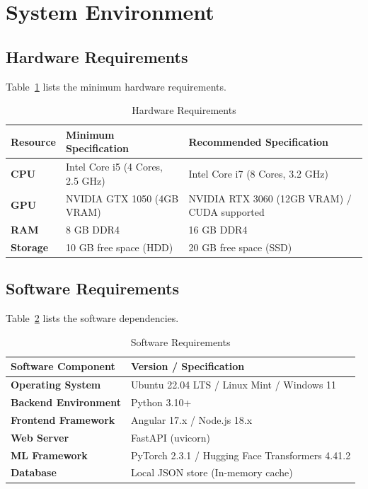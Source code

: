 \documentclass[12pt,a4paper,oneside]{report}
\begin{document}
\section{System Environment}

\subsection{Hardware Requirements}
Table~\ref{tab:hardware_reqs} lists the minimum hardware requirements.

\begin{table}[H]
    \centering
    \caption{Hardware Requirements}
    \label{tab:hardware_reqs}
    \begin{tabular}{lll}
        \toprule
        \textbf{Resource} & \textbf{Minimum Specification} & \textbf{Recommended Specification} \\
        \midrule
        \textbf{CPU} & Intel Core i5 (4 Cores, 2.5 GHz) & Intel Core i7 (8 Cores, 3.2 GHz) \\
        \textbf{GPU} & NVIDIA GTX 1050 (4GB VRAM) & NVIDIA RTX 3060 (12GB VRAM) / CUDA supported \\
        \textbf{RAM} & 8 GB DDR4 & 16 GB DDR4 \\
        \textbf{Storage} & 10 GB free space (HDD) & 20 GB free space (SSD) \\
        \bottomrule
    \end{tabular}
\end{table}

\subsection{Software Requirements}
Table~\ref{tab:software_reqs} lists the software dependencies.

\begin{table}[H]
    \centering
    \caption{Software Requirements}
    \label{tab:software_reqs}
    \begin{tabular}{ll}
        \toprule
        \textbf{Software Component} & \textbf{Version / Specification} \\
        \midrule
        \textbf{Operating System} & Ubuntu 22.04 LTS / Linux Mint / Windows 11 \\
        \textbf{Backend Environment} & Python 3.10+ \\
        \textbf{Frontend Framework} & Angular 17.x / Node.js 18.x \\
        \textbf{Web Server} & FastAPI (uvicorn) \\
        \textbf{ML Framework} & PyTorch 2.3.1 / Hugging Face Transformers 4.41.2 \\
        \textbf{Database} & Local JSON store (In-memory cache) \\
        \bottomrule
    \end{tabular}
\end{table}
\end{document}
